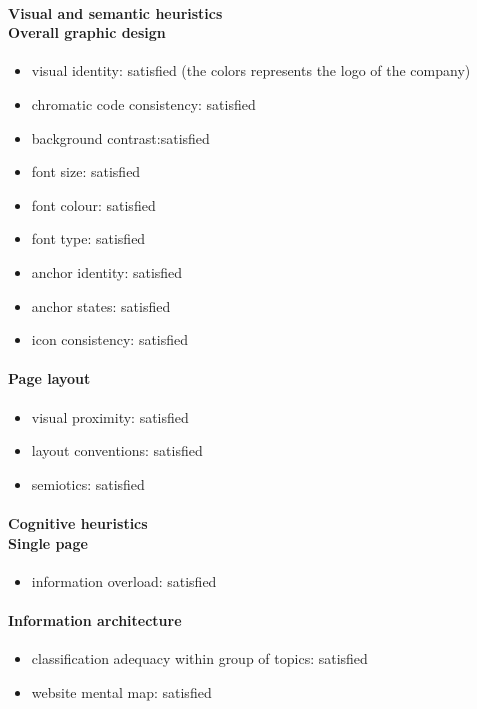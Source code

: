 \begin{enumerate}
	\paragraph*{Visual and semantic heuristics \\ Overall graphic design }
	\begin{itemize}
		\item visual identity: satisfied (the colors represents the logo of the company)
		\item chromatic code consistency: satisfied
		\item background contrast:satisfied
		\item font size: satisfied
		\item font colour: satisfied
		\item font type: satisfied
		\item anchor identity: satisfied
		\item anchor states: satisfied
		\item icon consistency: satisfied
	\end{itemize}

	\paragraph*{Page layout}
	\begin{itemize}
		\item visual proximity: satisfied
		\item layout conventions: satisfied
		\item semiotics: satisfied
	\end{itemize}

	\paragraph*{Cognitive heuristics \\ Single page}
	\begin{itemize}
		\item information overload: satisfied
	\end{itemize}	

	\paragraph*{Information architecture}
	\begin{itemize}
		\item classification adequacy within group of topics: satisfied
		\item website mental map: satisfied
	\end{itemize}
	\end{enumerate}